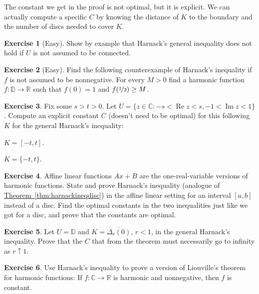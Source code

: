 \documentclass[12pt,openany]{book}
\renewcommand{\Re}{\operatorname{Re}}
\renewcommand{\Im}{\operatorname{Im}}
\newcommand{\C}{{\mathbb{C}}}
\newcommand{\R}{{\mathbb{R}}}
\newcommand{\D}{{\mathbb{D}}}
\theoremstyle{plain}
\theoremstyle{remark}
\theoremstyle{definition}
\newenvironment{exbox}{%
    \def\FrameCommand{\vrule width 1pt \relax\hspace{10pt}}%
    \MakeFramed{\advance\hsize-\width\FrameRestore}%
}{%
    \endMakeFramed
}
\newenvironment{expartshor}[1]{%
    \begingroup%
    \NumTabs{#1}%
    \leavevmode%
    \par%
    \begin{enumerate*}[a),itemjoin={\tab}]
}{%
    \end{enumerate*}\endgroup\par
}
\theoremstyle{exercise}
\newtheorem{exercise}{Exercise}[section]
\theoremstyle{example}
\newcommand{\thmref}[1]{\hyperref[#1]{Theorem~\ref*{#1}}}
\begin{document}
The constant we get in the proof is not optimal, but it is explicit.
We can actually compute a specific $C$ by knowing the distance of $K$
to the boundary and the number of discs needed to cover $K$.

\begin{exbox}
\begin{exercise}[Easy]
Show by example that Harnack's general inequality does not hold if $U$
is not assumed to be connected.
\end{exercise}

\begin{exercise}[Easy]
Find the following counterexample of Harnack's inequality
if $f$ is not assumed to be
nonnegative.  For every $M > 0$ find
a harmonic function $f \colon \D \to \R$ such that $f(0) = 1$ and
$f(\nicefrac{1}{2}) \geq M$.
\end{exercise}

\begin{exercise}
Fix some $s > t > 0$.
Let $U = \{z \in \C : -s < \Re z < s, -1 < \Im z < 1 \}$.
Compute an explicit constant $C$
(doesn't need to be optimal)
for this following $K$ for the general
Harnack's inequality:
\smallskip
\begin{expartshor}{2}
\item
$K = [-t,t]$.
\item
$K = \{-t,t\}$.
\end{expartshor}
\end{exercise}

\begin{exercise}
Affine linear functions $Ax+B$ are the one-real-variable
versions of harmonic functions.  State and prove Harnack's inequality
(analogue of \thmref{thm:harnackineqdisc})
in the affine linear setting for an interval $[a,b]$ instead of a disc.
Find the optimal constants in the two inequalities just like we got for a disc,
and prove that the constants are optimal.
\end{exercise}

\begin{exercise}
Let $U = \D$ and $K=\overline{\Delta_r(0)}$, $r < 1$, in the general 
Harnack's inequality.  Prove that the $C$ that from the theorem
must necessarily go to infinity as $r \uparrow 1$.
\end{exercise}

\begin{exercise}
Use Harnack's inequality to prove a version of Liouville's theorem
for harmonic functions:
If $f \colon \C \to \R$ is harmonic
and nonnegative, then $f$ is constant.
\end{exercise}
\end{exbox}
\end{document}
